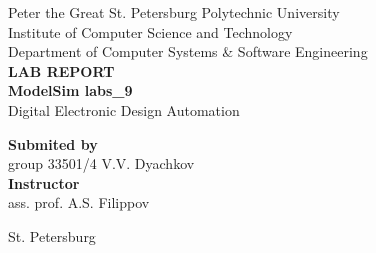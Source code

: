 \begin{titlepage}
\begin{center}
	Peter the Great St. Petersburg Polytechnic University\\[0.3cm]
	Institute of Computer Science and Technology\\[0.3cm]
	Department of Computer Systems \& Software Engineering\\[4.5cm]
	
	\textbf{LAB REPORT}\\[0.5cm]
	\textbf{ModelSim labs\_9}\\[0.1cm]
	Digital Electronic Design Automation\\[4.5cm]
\end{center}

\begin{flushright}
	\begin{minipage}{0.4\textwidth}
		\textbf{Submited by}\\[3mm]
		group 33501/4 \hspace*{3mm} V.V. Dyachkov\\[5mm]
		\textbf{Instructor}\\[5mm]
		\sign[1.8cm] \hspace*{0mm} ass. prof. A.S. Filippov\\[5mm]
	\end{minipage}
\end{flushright}

\vfill

\begin{center}
	St. Petersburg\\
	\the\year
\end{center}
\end{titlepage}

\addtocounter{page}{1}
